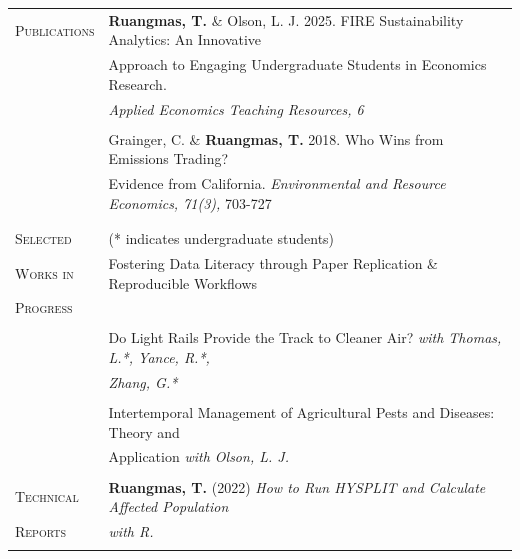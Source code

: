 \documentclass[letterpaper,11pt,oneside]{article}\usepackage[]{graphicx}\usepackage[]{xcolor}
\begin{document}
\noindent \begin{tabular}{p{1.2in} l}
\textsc{Publications}   & \textbf{Ruangmas, T.} \& Olson, L. J. 2025. FIRE Sustainability Analytics: An Innovative \\
				                & Approach to Engaging Undergraduate Students in Economics Research. \\
				                & \textit{Applied Economics Teaching Resources, 6} \href{https://doi.org/10.71162/aetr.782095}{\color{blue}{https://doi.org/10.71162/aetr.782095}} \\ 
	                      & \\  
                        & Grainger, C. \& \textbf{Ruangmas, T.} 2018. Who Wins from Emissions Trading? \\
				                & Evidence from California. \textit{Environmental and Resource Economics, 71(3),} 703-727 \\
				                & \href{https://doi.org/10.1007/s10640-017-0180-1}{\color{blue}{https://doi.org/10.1007/s10640-017-0180-1}} \\
				                & \\   
\textsc{Selected} & (* indicates undergraduate students) \\
\textsc{Works in} & Fostering Data Literacy through Paper Replication \& Reproducible Workflows \\
\textsc{Progress} & \href{https://drive.google.com/file/d/1fRY17-CxsH2L_wNmxx7SN8mxS3uf7Bmg/view?usp=drive_link}{\color{blue}{[Link]}} \\
	                & \\
	                & Do Light Rails Provide the Track to Cleaner Air? \textit{with Thomas, L.*, Yance, R.*,} \\
	                & \textit{Zhang, G.*} \\
	                & \\	                
                	& Intertemporal Management of Agricultural Pests and Diseases: Theory and \\			
                  & Application \textit{with Olson, L. J.}\\
                  & \\
\textsc{Technical} & \textbf{Ruangmas, T.} (2022) \textit{How to Run HYSPLIT and Calculate Affected Population} \\
\textsc{Reports}   & \textit{with R.} \href{https://ruangmas.github.io/hysplit.html}{\color{blue}{[Link]}} \\
                    & \\

\end{tabular}
\end{document}
